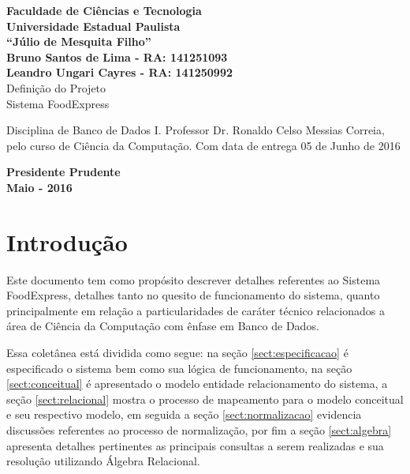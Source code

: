 \documentclass[12pt, onecolumn, titlepage]{article}
\begin{document}

\begin{titlepage} %
	
	\vfill
	\begin{center}
	
		{\large \textbf{Faculdade de Ciências e Tecnologia\\Universidade Estadual Paulista\\``Júlio de Mesquita Filho''}} \\[3cm]
		{\small \textbf{Bruno Santos de Lima - RA: 141251093}}\\
		{\small \textbf{Leandro Ungari Cayres - RA: 141250992}}\\[3cm]
		{\Large Definição do Projeto}\\
		{\Large Sistema FoodExpress}\\[3cm]

	\hspace{.45\textwidth} %
	\begin{minipage}{.5\textwidth}
		\small Disciplina de Banco de Dados I. Professor Dr. Ronaldo Celso Messias Correia, pelo curso de Ciência da Computação. Com data de entrega 05 de Junho de 2016 \\[0.5cm]
	\end{minipage}

	\vfill
	\vspace{1.5cm}
	
	\large \textbf{Presidente Prudente\\}
	\large \textbf{Maio - 2016}
	
	\end{center}
	
\end{titlepage}
\newpage

\renewcommand{\contentsname}{Índice}
\tableofcontents

\newpage

\section{Introdução}
\label{sect:introducao}

Este documento tem como propósito descrever detalhes referentes ao Sistema FoodExpress, detalhes tanto no quesito de funcionamento do sistema, quanto principalmente em relação a particularidades de caráter técnico relacionados a área de Ciência da Computação com ênfase em Banco de Dados. 

Essa coletânea está dividida como segue: na seção \ref{sect:especificacao} é especificado o sistema bem como sua lógica de funcionamento, na seção \ref{sect:conceitual} é apresentado o modelo entidade relacionamento do sistema, a seção \ref{sect:relacional} mostra o processo de mapeamento para o modelo conceitual e seu respectivo modelo, em seguida a seção \ref{sect:normalizacao} evidencia discussões referentes ao processo de normalização, por fim a seção \ref{sect:algebra} apresenta detalhes pertinentes as principais consultas a serem realizadas e sua resolução utilizando Álgebra Relacional.
\end{document}
